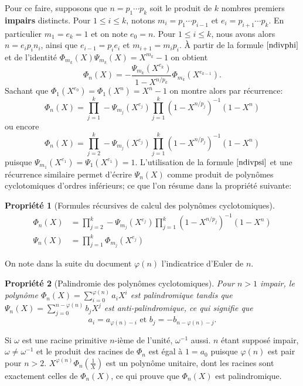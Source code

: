 \documentclass{article}
\theoremstyle{break}                  %
\newtheorem{propriete}{Propriété}
\begin{document}
Pour ce faire, supposons que $n = p_1 \cdots p_k$ soit le produit de $k$ nombres premiers \textbf{impairs} distincts. Pour $1 \le i \le k$, notons $m_i = p_1 \cdots p_{i-1}$ et $e_i = p_{i+1} \cdots p_{k}$. En particulier $m_1=e_k=1$ et on note $e_0 = n$. Pour $1 \le i \le k$, nous avons alors $n = e_i p_i n_i$, ainsi que $e_{i-1}=p_i e_i$ et $m_{i+1}=m_i p_i$. À partir de la formule $\ref{ndivphi}$ et de l'identité $\Phi_{m_k}(X) \Psi_{m_k}(X) = X^{m_k}-1$ on obtient
$$\Phi_{n}(X) = - \frac{\Psi_{m_k}(X^{e_k})}{1- X^{n/p_k}} \Phi_{m_k}(X^{e_{k-1}}).$$
Sachant que $\Phi_1(X^{e_0}) = \Phi_1(X^n) = X^n-1$ on montre alors par récurrence:
$$\Phi_n(X)=\prod_{j=1}^{k} - \Psi_{m_j}(X^{e_j}) \prod_{j=1}^{k} (1-X^{n/p_j})^{-1}(1-X^n)$$
ou encore $$\Phi_n(X)=\prod_{j=2}^{k} - \Psi_{m_j}(X^{e_j}) \prod_{j=1}^{k} (1-X^{n/p_j})^{-1}(1-X^n)$$
puisque $\Psi_{m_1}(X^{e_1}) = \Psi_{1}(X^{e_1}) =1$. L'utilisation de la formule $\ref{ndivpsi}$ et une récurrence similaire permet d'écrire $\Psi_n(X)$ comme produit de polynômes cyclotomiques d'ordres inférieurs; ce que l'on résume dans la propriété suivante:


\begin{propriete}[Formules récursives de calcul des polynômes cyclotomiques]
	\begin{align*}
		\Phi_n(X) &=\prod_{j=2}^{k} - \Psi_{m_j}(X^{e_j}) \prod_{j=1}^{k} (1-X^{n/p_j})^{-1}(1-X^n)\tag{3.17}\label{recurphi}\\
		\Psi_{n}(X) &=\prod_{j=1}^{k} \Phi_{m_j}(X^{e_j})\tag{3.25}\label{recurpsi}
	\end{align*}
\end{propriete}

On note dans la suite du document $\varphi(n)$ l'indicatrice d'Euler de $n$.

\begin{propriete}[Palindromie des polynômes cyclotomiques]
	Pour $n > 1$ impair, le polynôme $\Phi_n(X) = \sum_{i=0}^{\varphi(n)} a_i X^i$ est palindromique tandis que $\Psi_n(X) = \sum_{j=0}^{n-\varphi(n)} b_j X^j$ est anti-palindromique, ce qui signifie que
	$$a_i=a_{\varphi(n)-i} \text{ et } b_j=-b_{n-\varphi(n)-j}.$$
\end{propriete}
Si $\omega$ est une racine primitive $n$-ième de l'unité, $\omega^{-1}$ aussi. $n$ étant supposé impair, $\omega \neq \omega^{-1}$ et le produit des racines de $\Phi_{n}$ est égal à $1 = a_0$ puisque $\varphi(n)$ est pair pour $n > 2$. $X^{\varphi(n)} \Phi_n(\frac{1}{X})$ est un polynôme unitaire, dont les racines sont exactement celles de $\Phi_n(X)$, ce qui prouve que $\Phi_n(X)$ est palindromique.\\
\end{document}
